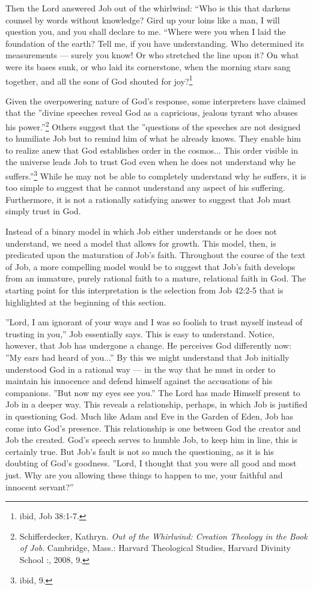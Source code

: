 Then the Lord answered Job out of the whirlwind: ``Who is this that darkens counsel by words without knowledge? Gird up your loins like a man, I will question you, and you shall declare to me. ``Where were you when I laid the foundation of the earth? Tell me, if you have understanding. Who determined its measurements --- surely you know! Or who stretched the line upon it? On what were its bases sunk, or who laid its cornerstone, when the morning stars sang together, and all the sons of God shouted for joy?\footnote{ibid, Job 38:1-7.}


Given the overpowering nature of God's response, some interpreters have claimed that the ''divine speeches reveal God as a capricious, jealous tyrant who abuses his power.''\footnote{Schifferdecker, Kathryn. \emph{Out of the Whirlwind: Creation Theology in the Book of Job}. Cambridge, Mass.: Harvard Theological Studies, Harvard Divinity School :, 2008, 9.} Others suggest that the ''questions of the speeches are not designed to humiliate Job but to remind him of what he already knows. They enable him to realize anew that God establishes order in the cosmos... This order visible in the universe leads Job to trust God even when he does not understand why he suffers.''\footnote{ibid, 9.} While he may not be able to completely understand why he suffers, it is too simple to suggest that he cannot understand any aspect of his suffering. Furthermore, it is not a rationally satisfying answer to suggest that Job must simply trust in God.

Instead of a binary model in which Job either understands or he does not understand, we need a model that allows for growth. This model, then, is predicated upon the maturation of Job's faith. Throughout the course of the text of Job, a more compelling model would be to suggest that Job's faith develops from an immature, purely rational faith to a mature, relational faith in God. The starting point for this interpretation is the selection from Job 42:2-5 that is highlighted at the beginning of this section.

''Lord, I am ignorant of your ways and I was so foolish to trust myself instead of trusting in you,'' Job essentially says. This is easy to understand. Notice, however, that Job has undergone a change. He perceives God differently now: ''My ears had heard of you...'' By this we might understand that Job initially understood God in a rational way --- in the way that he must in order to maintain his innocence and defend himself against the accusations of his companions. ''But now my eyes see you.'' The Lord has made Himself present to Job in a deeper way. This reveals a relationship, perhaps, in which Job is justified in questioning God. Much like Adam and Eve in the Garden of Eden, Job has come into God's presence. This relationship is one between God the creator and Job the created. God's speech serves to humble Job, to keep him in line, this is certainly true. But Job's fault is not so much the questioning, as it is his doubting of God's goodness. ''Lord, I thought that you were all good and most just. Why are you allowing these things to happen to me, your faithful and innocent servant?''

